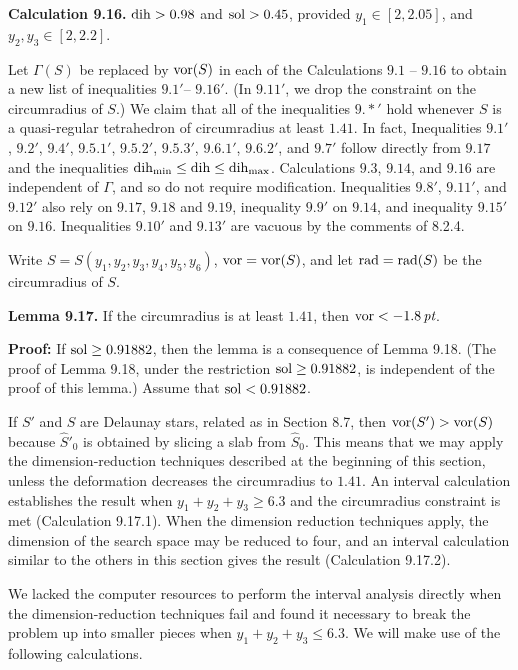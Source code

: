 \smallskip
{\bf Calculation 9.16.}  $\operatorname{dih}> 0.98$ and $\operatorname{sol}> 0.45$,
provided $y_1\in[2,2.05]$, and $y_2,y_3\in [2,2.2]$.

\bigskip
Let $\Gamma(S)$ be replaced by $\operatorname{vor}(S)$ in each of the Calculations
$9.1$ -- $9.16$ to obtain a new list of inequalities $9.1'$-- $9.16'$.  
(In
$9.11'$, we drop the constraint on the circumradius of $S$.)
We claim that all of the inequalities $9.*'$ hold whenever
$S$ is a quasi-regular tetrahedron of circumradius at least $1.41$.
In fact,  Inequalities $9.1'$, $9.2'$, $9.4'$, $9.5.1'$, $9.5.2'$,
$9.5.3'$, $9.6.1'$, $9.6.2'$, and $9.7'$ follow directly from
$9.17$ and the inequalities $\operatorname{dih}_{\min}\le\operatorname{dih}\le \operatorname{dih}_{\max}$.
Calculations $9.3$, $9.14$, and $9.16$ are independent of $\Gamma$,
and so do not require modification.  Inequalities $9.8'$, $9.11'$, and
$9.12'$ also rely on $9.17$, $9.18$ and $9.19$,  inequality $9.9'$ on
$9.14$, and inequality $9.15'$ on $9.16$.  Inequalities
$9.10'$ and $9.13'$ are vacuous by the comments of 8.2.4.

Write $S=S(y_1,y_2,y_3,y_4,y_5,y_6)$,
$\operatorname{vor} = \operatorname{vor}(S)$, and let $\operatorname{rad}=\operatorname{rad}(S)$ be the circumradius of $S$.

{\bf Lemma 9.17.}  If the circumradius is at least $1.41$,
then $\operatorname{vor}< -1.8\,\hbox{\it pt}$.

{\bf Proof:}  If $\operatorname{sol}\ge 0.91882$, then the lemma is a consequence of
Lemma 9.18.  (The proof of Lemma 9.18, under the restriction
$\operatorname{sol}\ge 0.91882$, is independent of the proof of this lemma.)
Assume that $\operatorname{sol}< 0.91882$.

If $S'$ and $S$ are Delaunay stars, related as in Section
8.7, then $\operatorname{vor}(S')> \operatorname{vor}(S)$ because  $\hat S'_0$ is
obtained by slicing a slab from  $\hat S_0$.  This
means that we may apply the dimension-reduction techniques
described at the beginning of this section, unless the
deformation decreases the circumradius to $1.41$.
An interval calculation
establishes the result when $y_1+y_2+y_3\ge 6.3$
and the circumradius constraint is met
(Calculation 9.17.1). 
When
the dimension reduction techniques apply, the dimension
of the search space may be reduced to four, and an interval
calculation similar to the others in this section gives the
result (Calculation 9.17.2).  

We lacked the  computer resources to perform the
interval analysis directly when the dimension-reduction techniques
fail and found it necessary to break the problem up into
smaller pieces when $y_1+y_2+y_3\le6.3$.
We will make use of the following calculations.


